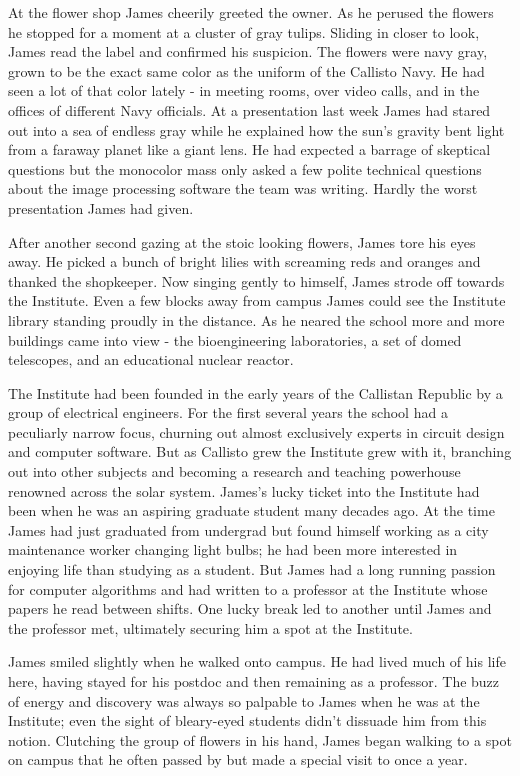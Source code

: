 \documentclass[openany, 12pt]{book} %
\begin{document}
At the flower shop James cheerily greeted the owner. As he perused the flowers he stopped for a moment at a cluster of gray tulips. Sliding in closer to look, James read the label and confirmed his suspicion. The flowers were navy gray, grown to be the exact same color as the uniform of the Callisto Navy. He had seen a lot of that color lately - in meeting rooms, over video calls, and in the offices of different Navy officials. At a presentation last week James had stared out into a sea of endless gray while he explained how the sun's gravity bent light from a faraway planet like a giant lens. He had expected a barrage of skeptical questions but the monocolor mass only asked a few polite technical questions about the image processing software the team was writing. Hardly the worst presentation James had given.

After another second gazing at the stoic looking flowers, James tore his eyes away. He picked a bunch of bright lilies with screaming reds and oranges and thanked the shopkeeper. Now singing gently to himself, James strode off towards the Institute. Even a few blocks away from campus James could see the Institute library standing proudly in the distance. As he neared the school more and more buildings came into view - the bioengineering laboratories, a set of domed telescopes, and an educational nuclear reactor.

The Institute had been founded in the early years of the Callistan Republic by a group of electrical engineers. For the first several years the school had a peculiarly narrow focus, churning out almost exclusively experts in circuit design and computer software. But as Callisto grew the Institute grew with it, branching out into other subjects and becoming a research and teaching powerhouse renowned across the solar system. James's lucky ticket into the Institute had been when he was an aspiring graduate student many decades ago. At the time James had just graduated from undergrad but found himself working as a city maintenance worker changing light bulbs; he had been more interested in enjoying life than studying as a student. But James had a long running passion for computer algorithms and had written to a professor at the Institute whose papers he read between shifts. One lucky break led to another until James and the professor met, ultimately securing him a spot at the Institute.

James smiled slightly when he walked onto campus. He had lived much of his life here, having stayed for his postdoc and then remaining as a professor. The buzz of energy and discovery was always so palpable to James when he was at the Institute; even the sight of bleary-eyed students didn't dissuade him from this notion. Clutching the group of flowers in his hand, James began walking to a spot on campus that he often passed by but made a special visit to once a year.
\end{document}
